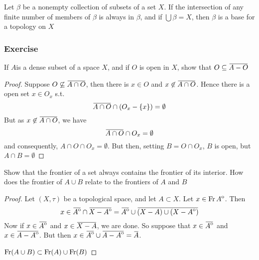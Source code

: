 \documentclass[11pt]{article}
\begin{document}
\begin{theorem}[]
Let \(\beta\) be a nonempty collection of subsets of a set \(X\). If the
intersection of any finite number of members of \(\beta\) is always in \(\beta\), and
if \(\bigcup\beta=X\), then \(\beta\) is a base for a topology on \(X\)
\end{theorem}

\subsubsection{Exercise}
\label{sec:orgf2e0762}
\begin{exercise}
\label{ex2.1.5}
If \(A\)is a dense subset of a space \(X\), and if \(O\) is open in \(X\),
show that \(O\subseteq\bbar{A-O}\)
\end{exercise}

\begin{proof}
Suppose \(O\not\subseteq\bbar{A\cap O}\), then there is \(x\in O\) and
\(x\not\in\bbar{A\cap O}\). Hence there is a open set \(x\in O_x\) s.t.
\begin{equation*}
\bbar{A\cap O}\cap(O_x-\{x\})=\emptyset
\end{equation*}
But as \(x\not\in\bbar{A\cap O}\), we have
\begin{equation*}
\bbar{A\cap O}\cap O_x=\emptyset
\end{equation*}
and consequently, \(A\cap O\cap O_x=\emptyset\). But then, setting \(B=O\cap
    O_x\), \(B\) is open, but \(A\cap B=\emptyset\)
\end{proof}

\begin{exercise}
\label{ex2.1.10}
Show that the frontier of a set always contains the frontier of its
interior. How does the frontier of \(A\cup B\) relate to the frontiers of
\(A\) and \(B\)
\end{exercise}

\begin{proof}
Let \((X,\tau)\) be a topological space, and let \(A\subset X\). Let
\(x\in\operatorname{Fr}{\kern0ptA}^{\mathrm{o}}\). Then
\begin{equation*}
x\in\bbar{\interior{A}}\cap\bbar{X-\interior{A}}=
\bbar{\interior{A}}\cup\bbar{(X-A)\cup(X-\interior{A})}
\end{equation*}
Now if \(x\in\bbar{\interior{A}}\) and \(x\in\bbar{X-A}\), we are done.
So suppose that \(x\in\bbar{\interior{A}}\) and
\(x\in\bbar{A-\interior{A}}\). But then
\(x\in\bbar{\interior{A}}\cup\bbar{A-\interior{A}}=\bbar{A}\).

\(\operatorname{Fr}(A\cup B)\subset\operatorname{Fr}(A)\cup\operatorname{Fr}(B)\)
\end{proof}
\end{document}
